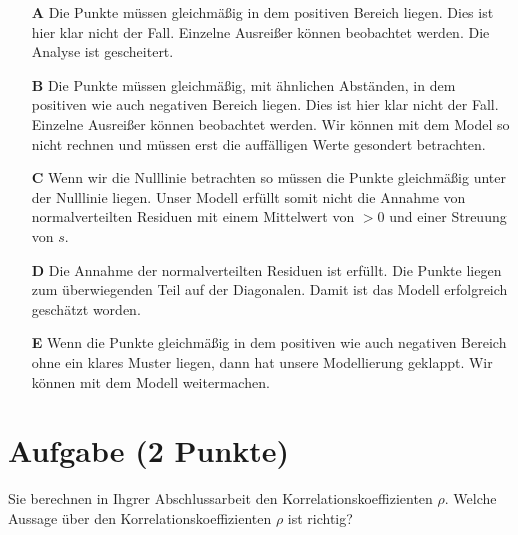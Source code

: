 \documentclass[a4paper, 9pt]{scrartcl}\usepackage[]{graphicx}\usepackage[]{xcolor}
\begin{document}
\begin{enumerate}
\item [\textbf{A} \msquare] Die Punkte müssen gleichmäßig in dem positiven Bereich liegen. Dies ist hier klar nicht der Fall. Einzelne Ausreißer können beobachtet werden. Die Analyse ist gescheitert.
\item [\textbf{B} \msquare] Die Punkte müssen gleichmäßig, mit ähnlichen Abständen, in dem positiven wie auch negativen Bereich liegen. Dies ist hier klar nicht der Fall. Einzelne Ausreißer können beobachtet werden. Wir können mit dem Model so nicht rechnen und müssen erst die auffälligen Werte gesondert betrachten.
\item [\textbf{C} \msquare] Wenn wir die Nulllinie betrachten so müssen die Punkte gleichmäßig unter der Nulllinie liegen. Unser Modell erfüllt somit nicht die Annahme von normalverteilten Residuen mit einem Mittelwert von $>0$ und einer Streuung von $s$.
\item [\textbf{D} \msquare] Die Annahme der normalverteilten Residuen ist erfüllt. Die Punkte liegen zum überwiegenden Teil auf der Diagonalen. Damit ist das Modell erfolgreich geschätzt worden.
\item [\textbf{E} \msquare] Wenn die Punkte gleichmäßig in dem positiven wie auch negativen Bereich ohne ein klares Muster liegen, dann hat unsere Modellierung geklappt. Wir können mit dem Modell weitermachen.
\end{enumerate}

\section{Aufgabe \hfill (2 Punkte)}




Sie berechnen in Ihgrer Abschlussarbeit den Korrelationskoeffizienten $\rho$. Welche Aussage über den Korrelationskoeffizienten $\rho$ ist richtig?
\end{document}
